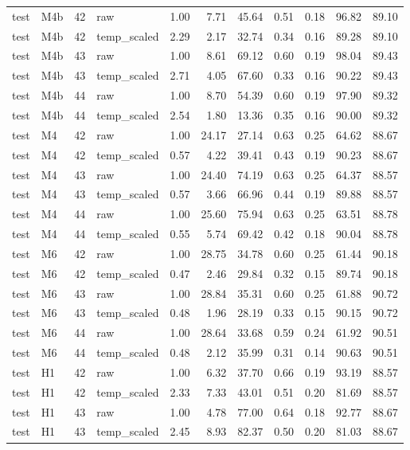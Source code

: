 \begin{tabular}{llrlrrrrrrr}
test & M4b & 42 & raw & 1.00 & 7.71 & 45.64 & 0.51 & 0.18 & 96.82 & 89.10 \\
test & M4b & 42 & temp\_scaled & 2.29 & 2.17 & 32.74 & 0.34 & 0.16 & 89.28 & 89.10 \\
test & M4b & 43 & raw & 1.00 & 8.61 & 69.12 & 0.60 & 0.19 & 98.04 & 89.43 \\
test & M4b & 43 & temp\_scaled & 2.71 & 4.05 & 67.60 & 0.33 & 0.16 & 90.22 & 89.43 \\
test & M4b & 44 & raw & 1.00 & 8.70 & 54.39 & 0.60 & 0.19 & 97.90 & 89.32 \\
test & M4b & 44 & temp\_scaled & 2.54 & 1.80 & 13.36 & 0.35 & 0.16 & 90.00 & 89.32 \\
test & M4 & 42 & raw & 1.00 & 24.17 & 27.14 & 0.63 & 0.25 & 64.62 & 88.67 \\
test & M4 & 42 & temp\_scaled & 0.57 & 4.22 & 39.41 & 0.43 & 0.19 & 90.23 & 88.67 \\
test & M4 & 43 & raw & 1.00 & 24.40 & 74.19 & 0.63 & 0.25 & 64.37 & 88.57 \\
test & M4 & 43 & temp\_scaled & 0.57 & 3.66 & 66.96 & 0.44 & 0.19 & 89.88 & 88.57 \\
test & M4 & 44 & raw & 1.00 & 25.60 & 75.94 & 0.63 & 0.25 & 63.51 & 88.78 \\
test & M4 & 44 & temp\_scaled & 0.55 & 5.74 & 69.42 & 0.42 & 0.18 & 90.04 & 88.78 \\
test & M6 & 42 & raw & 1.00 & 28.75 & 34.78 & 0.60 & 0.25 & 61.44 & 90.18 \\
test & M6 & 42 & temp\_scaled & 0.47 & 2.46 & 29.84 & 0.32 & 0.15 & 89.74 & 90.18 \\
test & M6 & 43 & raw & 1.00 & 28.84 & 35.31 & 0.60 & 0.25 & 61.88 & 90.72 \\
test & M6 & 43 & temp\_scaled & 0.48 & 1.96 & 28.19 & 0.33 & 0.15 & 90.15 & 90.72 \\
test & M6 & 44 & raw & 1.00 & 28.64 & 33.68 & 0.59 & 0.24 & 61.92 & 90.51 \\
test & M6 & 44 & temp\_scaled & 0.48 & 2.12 & 35.99 & 0.31 & 0.14 & 90.63 & 90.51 \\
test & H1 & 42 & raw & 1.00 & 6.32 & 37.70 & 0.66 & 0.19 & 93.19 & 88.57 \\
test & H1 & 42 & temp\_scaled & 2.33 & 7.33 & 43.01 & 0.51 & 0.20 & 81.69 & 88.57 \\
test & H1 & 43 & raw & 1.00 & 4.78 & 77.00 & 0.64 & 0.18 & 92.77 & 88.67 \\
test & H1 & 43 & temp\_scaled & 2.45 & 8.93 & 82.37 & 0.50 & 0.20 & 81.03 & 88.67 \\

\end{tabular}
